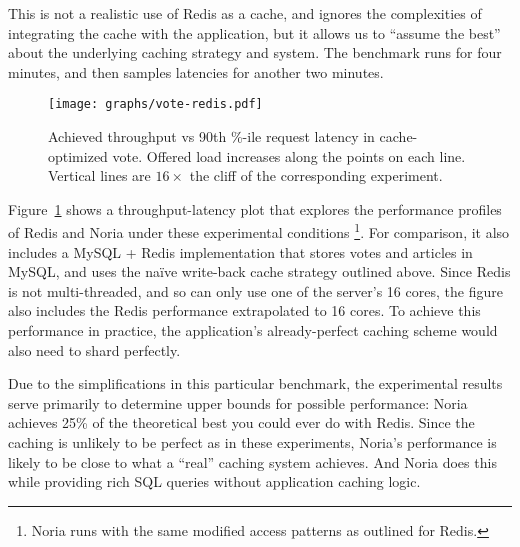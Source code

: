 This is not a realistic use of Redis as a cache, and ignores the complexities of
integrating the cache with the application, but it allows us to ``assume the
best'' about the underlying caching strategy and system. The benchmark runs for
four minutes, and then samples latencies for another two minutes.

\begin{figure}[h]
  \centering
  \texttt{[image: graphs/vote-redis.pdf]}
  \caption{Achieved throughput vs 90th \%-ile request latency in cache-optimized
  vote. Offered load increases along the points on each line. Vertical
  lines are $16\times$ the cliff of the corresponding experiment.}
  \label{f:vote-redis}
\end{figure}

Figure~\ref{f:vote-redis} shows a throughput-latency plot that explores the
performance profiles of Redis and Noria under these experimental conditions%
\footnote{Noria runs with the same modified access patterns as outlined for
Redis.}. For comparison, it also includes a MySQL + Redis implementation that
stores votes and articles in MySQL, and uses the na\"ive write-back cache
strategy outlined above. Since Redis is not multi-threaded, and so can only use
one of the server's 16 cores, the figure also includes the Redis performance
extrapolated to 16 cores. To achieve this performance in practice, the
application's already-perfect caching scheme would also need to shard perfectly.

Due to the simplifications in this particular benchmark, the experimental
results serve primarily to determine upper bounds for possible performance:
Noria achieves 25\% of the theoretical best you could ever do with Redis. Since
the caching is unlikely to be perfect as in these experiments, Noria's
performance is likely to be close to what a ``real'' caching system achieves.
And Noria does this while providing rich SQL queries without application caching
logic.

